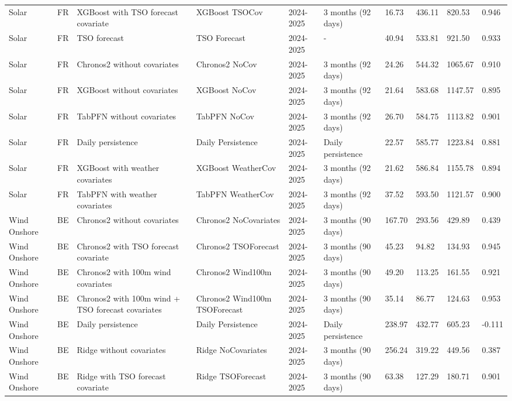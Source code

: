 \begin{longtable}{llllllllll}
Solar & FR & XGBoost with TSO forecast covariate & XGBoost TSOCov & 2024-2025 & 3 months (92 days) & 16.73 & 436.11 & 820.53 & 0.946 \\
Solar & FR & TSO forecast & TSO Forecast & 2024-2025 & - & 40.94 & 533.81 & 921.50 & 0.933 \\
Solar & FR & Chronos2 without covariates & Chronos2 NoCov & 2024-2025 & 3 months (92 days) & 24.26 & 544.32 & 1065.67 & 0.910 \\
Solar & FR & XGBoost without covariates & XGBoost NoCov & 2024-2025 & 3 months (92 days) & 21.64 & 583.68 & 1147.57 & 0.895 \\
Solar & FR & TabPFN without covariates & TabPFN NoCov & 2024-2025 & 3 months (92 days) & 26.70 & 584.75 & 1113.82 & 0.901 \\
Solar & FR & Daily persistence & Daily Persistence & 2024-2025 & Daily persistence & 22.57 & 585.77 & 1223.84 & 0.881 \\
Solar & FR & XGBoost with weather covariates & XGBoost WeatherCov & 2024-2025 & 3 months (92 days) & 21.62 & 586.84 & 1155.78 & 0.894 \\
Solar & FR & TabPFN with weather covariates & TabPFN WeatherCov & 2024-2025 & 3 months (92 days) & 37.52 & 593.50 & 1121.57 & 0.900 \\
Wind Onshore & BE & Chronos2 without covariates & Chronos2 NoCovariates & 2024-2025 & 3 months (90 days) & 167.70 & 293.56 & 429.89 & 0.439 \\
Wind Onshore & BE & Chronos2 with TSO forecast covariate & Chronos2 TSOForecast & 2024-2025 & 3 months (90 days) & 45.23 & 94.82 & 134.93 & 0.945 \\
Wind Onshore & BE & Chronos2 with 100m wind covariates & Chronos2 Wind100m & 2024-2025 & 3 months (90 days) & 49.20 & 113.25 & 161.55 & 0.921 \\
Wind Onshore & BE & Chronos2 with 100m wind + TSO forecast covariates & Chronos2 Wind100m TSOForecast & 2024-2025 & 3 months (90 days) & 35.14 & 86.77 & 124.63 & 0.953 \\
Wind Onshore & BE & Daily persistence & Daily Persistence & 2024-2025 & Daily persistence & 238.97 & 432.77 & 605.23 & -0.111 \\
Wind Onshore & BE & Ridge without covariates & Ridge NoCovariates & 2024-2025 & 3 months (90 days) & 256.24 & 319.22 & 449.56 & 0.387 \\
Wind Onshore & BE & Ridge with TSO forecast covariate & Ridge TSOForecast & 2024-2025 & 3 months (90 days) & 63.38 & 127.29 & 180.71 & 0.901 \\

\end{longtable}
